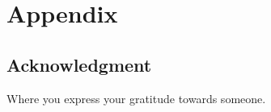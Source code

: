 \part*{Appendix}

\chapter*{Acknowledgment}

Where you express your gratitude towards someone.



\listoffigures
\listoftables
